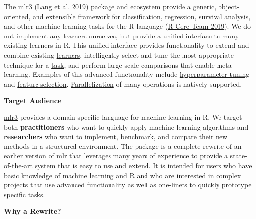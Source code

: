 \documentclass[
]{scrbook}
\begin{document}
The \href{https://mlr3.mlr-org.com}{mlr3} (\protect\hyperlink{ref-mlr3}{Lang et al. 2019}) package and \href{https://github.com/mlr-org/mlr3/wiki/Extension-Packages}{ecosystem} provide a generic, object-oriented, and extensible framework for \protect\hyperlink{tasks}{classification}, \protect\hyperlink{tasks}{regression}, \protect\hyperlink{survival}{survival analysis}, and other machine learning tasks for the R language (\protect\hyperlink{ref-R}{R Core Team 2019}).
We do not implement any \protect\hyperlink{learners}{learners} ourselves, but provide a unified interface to many existing learners in R.
This unified interface provides functionality to extend and combine existing \protect\hyperlink{learners}{learners}, intelligently select and tune the most appropriate technique for a \protect\hyperlink{tasks}{task}, and perform large-scale comparisons that enable meta-learning.
Examples of this advanced functionality include \protect\hyperlink{tuning}{hyperparameter tuning} and \protect\hyperlink{fs}{feature selection}. \protect\hyperlink{parallelization}{Parallelization} of many operations is natively supported.

\textbf{Target Audience}

\href{https://mlr3.mlr-org.com}{mlr3} provides a domain-specific language for machine learning in R.
We target both \textbf{practitioners} who want to quickly apply machine learning algorithms and \textbf{researchers} who want to implement, benchmark, and compare their new methods in a structured environment.
The package is a complete rewrite of an earlier version of \href{https://mlr.mlr-org.com}{mlr} that leverages many years of experience to provide a state-of-the-art system that is easy to use and extend.
It is intended for users who have basic knowledge of machine learning and R and who are interested in complex projects that use advanced functionality as well as one-liners to quickly prototype specific tasks.

\textbf{Why a Rewrite?}
\end{document}
